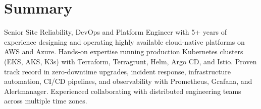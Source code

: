 \section*{Summary}

Senior Site Reliability, DevOps and Platform Engineer with 5+ years of experience designing and operating highly available cloud-native platforms on AWS and Azure. Hands-on expertise running production Kubernetes clusters (EKS, AKS, K3s) with Terraform, Terragrunt, Helm, Argo CD, and Istio. Proven track record in zero-downtime upgrades, incident response, infrastructure automation, CI/CD pipelines, and observability with Prometheus, Grafana, and Alertmanager. Experienced collaborating with distributed engineering teams across multiple time zones.
